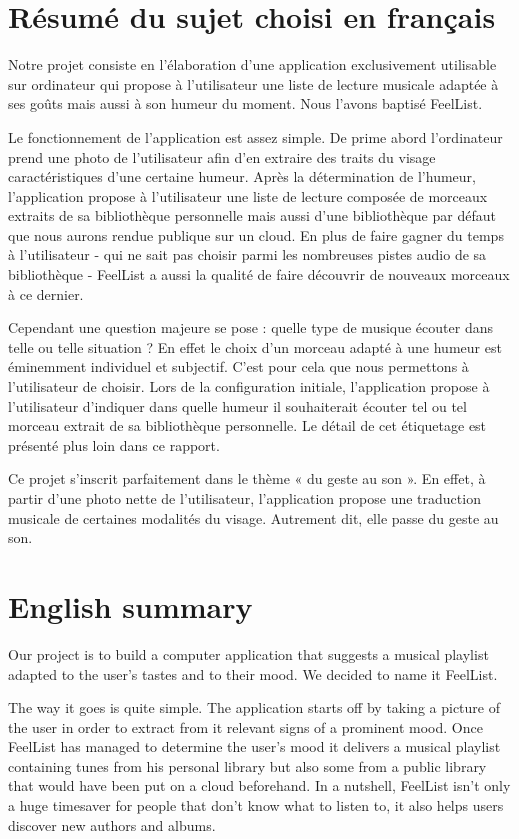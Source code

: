 \section{Résumé du sujet choisi en français}

	Notre projet consiste en l’élaboration d’une application exclusivement utilisable sur ordinateur qui propose à l’utilisateur une liste de lecture musicale adaptée à ses goûts mais aussi à son humeur du moment.
	Nous l’avons baptisé FeelList.
		
	Le fonctionnement de l’application est assez simple.
	De prime abord l’ordinateur prend une photo de l’utilisateur afin d’en extraire des traits du visage caractéristiques d’une certaine humeur.
	Après la détermination de l’humeur, l’application propose à l’utilisateur une liste de lecture composée de morceaux extraits de sa bibliothèque personnelle mais aussi d’une bibliothèque par défaut que nous aurons rendue publique sur un cloud.
	En plus de faire gagner du temps à l’utilisateur - qui ne sait pas choisir parmi les nombreuses pistes audio de sa bibliothèque - FeelList a aussi la qualité de faire découvrir de nouveaux morceaux à ce dernier.

	Cependant une question majeure se pose : quelle type de musique écouter dans telle ou telle situation ?
	En effet le choix d’un morceau adapté à une humeur est éminemment individuel et subjectif.
	C’est pour cela que nous permettons à l’utilisateur de choisir.
	Lors de la configuration initiale, l’application propose à l’utilisateur d’indiquer dans quelle humeur il souhaiterait écouter tel ou tel morceau extrait de sa bibliothèque personnelle.
	Le détail de cet étiquetage est présenté plus loin dans ce rapport.

	Ce projet s’inscrit parfaitement dans le thème « du geste au son ».
	En effet, à partir d’une photo nette de l’utilisateur, l’application propose une traduction musicale de certaines modalités du visage.
	Autrement dit, elle passe du geste au son.

\section{English summary}

	Our project is to build a computer application that suggests a musical playlist adapted to the user’s tastes and to their mood.
	We decided to name it FeelList.
		
	The way it goes is quite simple.
	The application starts off by taking a picture of the user in order to extract from it relevant signs of a prominent mood.
	Once FeelList has managed to determine the user’s mood it delivers a musical playlist containing tunes from his personal library but also some from a public library that would have been put on a cloud beforehand.
	In a nutshell, FeelList isn’t only a huge timesaver for people that don’t know what to listen to, it also helps users discover new authors and albums.
		
